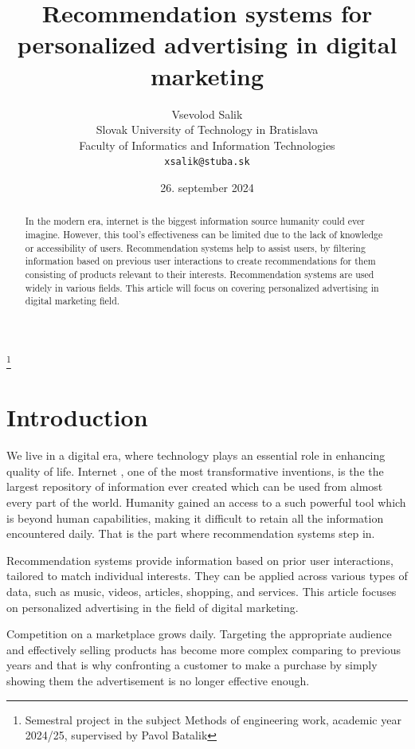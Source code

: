 \documentclass[10pt,twoside,english,a4paper]{article}
\title{Recommendation systems for personalized advertising in digital marketing} %
\author{Vsevolod Salik\\[2pt]
	{\small Slovak University of Technology in Bratislava }\\
	{\small Faculty of Informatics and Information Technologies }\\
	{\small \texttt{xsalik@stuba.sk}}
	}
\date{\small 26. september 2024}
\begin{document}
\maketitle
\thanks{Semestral project in the subject Methods of engineering work, academic year 2024/25, supervised by Pavol Batalik}



\begin{abstract}
	In the modern era, internet is the biggest information source humanity could ever imagine.  However, this tool’s effectiveness can be limited due to the lack of knowledge or accessibility of users. Recommendation systems help to assist users, by filtering information based on previous user interactions to create recommendations for them consisting of products relevant to their interests. Recommendation systems are used widely in various fields. This article will focus on covering personalized advertising in digital marketing field.
\end{abstract}



\section{Introduction}
We live in a digital era, where technology plays an essential role in enhancing quality of life. Internet , one of the most transformative inventions, is the the largest repository of information ever created which can be used from almost every part of the world. Humanity gained an access to a such powerful tool which is beyond human capabilities, making it difficult to retain all the information encountered daily. That is the part where recommendation systems step in.

\medskip Recommendation systems provide information based on prior user interactions, tailored to match individual interests. They can be applied across various types of data, such as music, videos, articles, shopping, and services. This article focuses on personalized advertising in the field of digital marketing.

\medskip Competition on a marketplace grows daily. Targeting the appropriate audience and effectively selling products has become more complex comparing to previous years and that is why confronting a customer to make a purchase by simply showing them the advertisement is no longer effective enough.
\end{document}
